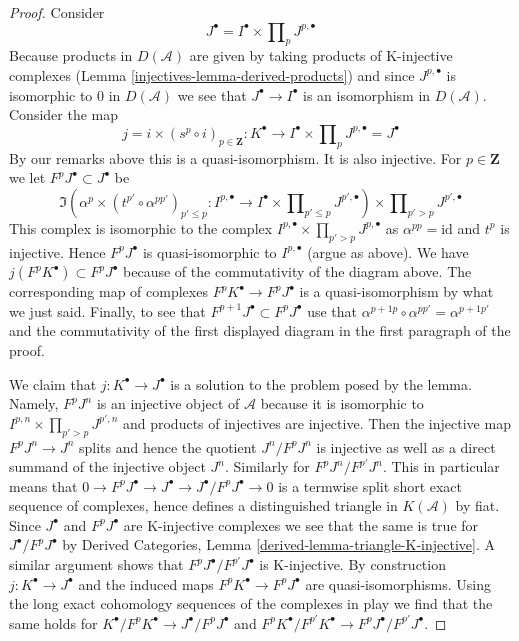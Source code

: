 \begin{proof}
\medskip\noindent
Consider
$$
J^\bullet = I^\bullet \times \prod\nolimits_p J^{p, \bullet}
$$
Because products in $D(\mathcal{A})$ are given by taking
products of K-injective complexes
(Lemma \ref{injectives-lemma-derived-products})
and since $J^{p, \bullet}$
is isomorphic to $0$ in $D(\mathcal{A})$ we see that
$J^\bullet \to I^\bullet$ is an isomorphism in $D(\mathcal{A})$.
Consider the map
$$
j = i \times (s^p \circ i)_{p \in \mathbf{Z}} :
K^\bullet
\longrightarrow
I^\bullet \times \prod\nolimits_p J^{p, \bullet} = J^\bullet
$$
By our remarks above this is a quasi-isomorphism. It is also injective.
For $p \in \mathbf{Z}$ we let $F^pJ^\bullet \subset J^\bullet$ be
$$
\Im\left(
\alpha^p \times (t^{p'} \circ \alpha^{pp'})_{p' \leq p} :
I^{p, \bullet}
\to
I^\bullet \times \prod\nolimits_{p' \leq p} J^{p', \bullet}
\right)
\times \prod\nolimits_{p' > p} J^{p', \bullet}
$$
This complex is isomorphic to the complex
$I^{p, \bullet} \times \prod_{p' > p} J^{p, \bullet}$
as $\alpha^{pp} = \text{id}$ and $t^p$ is injective.
Hence $F^pJ^\bullet$ is quasi-isomorphic to $I^{p, \bullet}$ (argue
as above). We have $j(F^pK^\bullet) \subset F^pJ^\bullet$ because
of the commutativity of the diagram above. The corresponding
map of complexes $F^pK^\bullet \to F^pJ^\bullet$ is a quasi-isomorphism
by what we just said. Finally, to see that
$F^{p + 1}J^\bullet \subset F^pJ^\bullet$
use that $\alpha^{p + 1p} \circ \alpha^{pp'} = \alpha^{p + 1p'}$
and the commutativity of the first displayed diagram
in the first paragraph of the proof.

\medskip\noindent
We claim that $j : K^\bullet \to J^\bullet$ is a solution to the
problem posed by the lemma. Namely, $F^pJ^n$ is an injective object
of $\mathcal{A}$ because it is isomorphic to
$I^{p, n} \times \prod_{p' > p} J^{p', n}$ and products of
injectives are injective. Then the injective map $F^pJ^n \to J^n$
splits and hence the quotient $J^n/F^pJ^n$ is injective as well
as a direct summand of the injective object $J^n$.
Similarly for $F^pJ^n/F^{p'}J^n$. This in particular means
that $0 \to F^pJ^\bullet \to J^\bullet \to J^\bullet/F^pJ^\bullet \to 0$
is a termwise split short exact sequence of complexes, hence defines
a distinguished triangle in $K(\mathcal{A})$ by fiat.
Since $J^\bullet$ and $F^pJ^\bullet$ are K-injective complexes
we see that the same is true for $J^\bullet/F^pJ^\bullet$
by Derived Categories, Lemma \ref{derived-lemma-triangle-K-injective}.
A similar argument shows that $F^pJ^\bullet/F^{p'}J^\bullet$
is K-injective. By construction $j : K^\bullet \to J^\bullet$
and the induced maps $F^pK^\bullet \to F^pJ^\bullet$ are
quasi-isomorphisms. Using the long exact cohomology sequences
of the complexes in play we find that the same holds for
$K^\bullet/F^pK^\bullet \to J^\bullet/F^pJ^\bullet$ and
$F^pK^\bullet/F^{p'}K^\bullet \to F^pJ^\bullet/F^{p'}J^\bullet$.
\end{proof}

